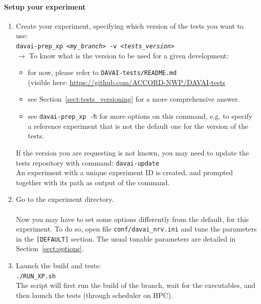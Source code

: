 \documentclass[a4paper,10pt,twoside]{article}
\begin{document}
\paragraph{Setup your experiment}
\begin{enumerate}[label=(\alph*)]
 \item Create your experiment, specifying which version of the tests you want to use:\\
 \texttt{davai-prep\_xp \textit{<my\_branch>} -v \textit{<tests\_version>}}\\
 
 $\rightarrow$ To know what is the version to be used for a given development:
 \begin{itemize}
  \item for now, please refer to \texttt{DAVAI-tests/README.md}\\
        (visible here: \href{https://github.com/ACCORD-NWP/DAVAI-tests}{https://github.com/ACCORD-NWP/DAVAI-tests}
  \item see Section~\ref{sect:tests_versioning} for a more comprehensive answer.
  \item see \texttt{davai-prep\_xp -h} for more options on this command, e.g. to specify a reference experiment that is not the default one for the version of the tests.
 \end{itemize}
 If the version you are requesting is not known, you may need to update the tests repository with command: \texttt{davai-update}\\
 An experiment with a unique experiment ID is created, and prompted together with its path as output of the command.
 \item Go to the experiment directory.\\
 \\
 Now you may have to set some options differently from the default, for this experiment. To do so, open file \texttt{conf/davai\_nrv.ini} and tune the parameters in the \texttt{[DEFAULT]} section. The usual tunable parameters are detailed in Section~\ref{sect:options}.
 \item Launch the build and tests:\\
 \texttt{./RUN\_XP.sh}\\
 The script will first run the build of the branch, wait for the executables, and then launch the tests (through scheduler on HPC).
\end{enumerate}
\end{document}
